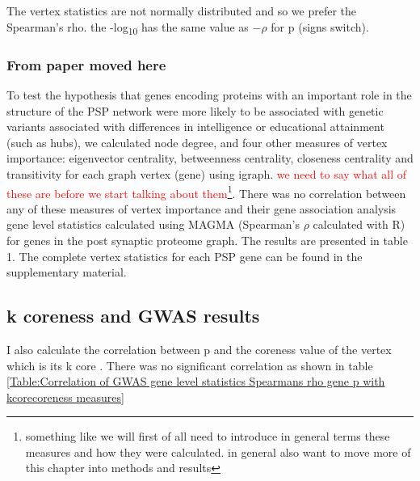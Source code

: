 The vertex statistics are not normally distributed  and so we prefer the Spearman's rho. the -log\textsubscript{10} has the same value as $-\rho$ for p (signs switch).

\subsubsection{From paper moved here}
To test the hypothesis that genes encoding proteins with an important role in the structure of the PSP network were more likely to be associated with genetic variants associated with differences in intelligence or educational attainment (such as hubs), we calculated node degree, and four other measures of vertex importance: eigenvector centrality, betweenness centrality, closeness centrality and transitivity for each graph vertex (gene) using igraph. \cite{csardi2006igraph} \textcolor{red}{we need to say what all of these are before we start talking about them}\footnote{something like we will first of all need to introduce in general terms these measures and how they were calculated. in general also want to move more of this chapter into methods and results}. There was no correlation between any of these measures of vertex importance and their gene association analysis gene level statistics calculated using MAGMA (Spearman’s $\rho$ calculated with R) for genes in the post synaptic proteome graph. The results are presented in table 1. The complete vertex statistics for each PSP gene can be found in the supplementary material. 


 \subsection{k coreness and GWAS results}
I also calculate the correlation between p and the coreness value of the vertex which is its k core . There was no significant correlation as shown in table \ref{Table:Correlation of GWAS gene level statistics Spearmans rho gene p  with kcorecoreness measures}


